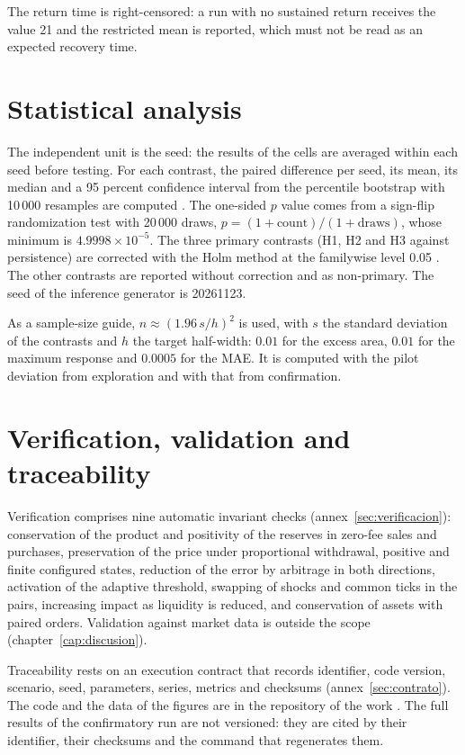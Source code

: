 The return time is right-censored: a run with no sustained return receives the value 21 and the restricted mean is reported, which must not be read as an expected recovery time.

\section{Statistical analysis}
\label{sec:analisis-estadistico}

The independent unit is the seed: the results of the cells are averaged within each seed before testing. For each contrast, the paired difference per seed, its mean, its median and a 95 percent confidence interval from the percentile bootstrap with 10\,000 resamples are computed \cite{efron1979bootstrap}. The one-sided $p$ value comes from a sign-flip randomization test with 20\,000 draws, $p=(1+\text{count})/(1+\text{draws})$, whose minimum is $4.9998\times10^{-5}$. The three primary contrasts (H1, H2 and H3 against persistence) are corrected with the Holm method at the familywise level 0.05 \cite{holm1979simple}. The other contrasts are reported without correction and as non-primary. The seed of the inference generator is 20261123.

As a sample-size guide, $n\approx(1.96\,s/h)^2$ is used, with $s$ the standard deviation of the contrasts and $h$ the target half-width: $0.01$ for the excess area, $0.01$ for the maximum response and $0.0005$ for the MAE. It is computed with the pilot deviation from exploration and with that from confirmation.

\section{Verification, validation and traceability}

Verification comprises nine automatic invariant checks (annex~\ref{sec:verificacion}): conservation of the product and positivity of the reserves in zero-fee sales and purchases, preservation of the price under proportional withdrawal, positive and finite configured states, reduction of the error by arbitrage in both directions, activation of the adaptive threshold, swapping of shocks and common ticks in the pairs, increasing impact as liquidity is reduced, and conservation of assets with paired orders. Validation against market data is outside the scope (chapter~\ref{cap:discusion}).

Traceability rests on an execution contract that records identifier, code version, scenario, seed, parameters, series, metrics and checksums (annex~\ref{sec:contrato}). The code and the data of the figures are in the repository of the work \cite{calderon2026repository}. The full results of the confirmatory run are not versioned: they are cited by their identifier, their checksums and the command that regenerates them.
